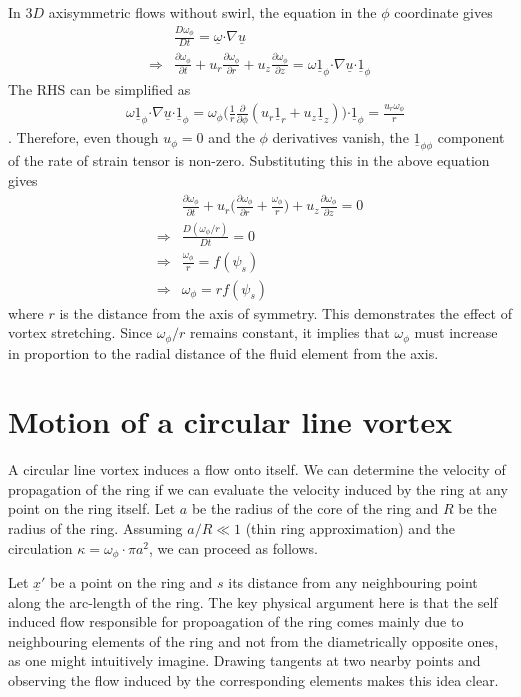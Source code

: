 \documentclass[11pt,a4paper]{article}
\newcommand{\pd}[2]{\frac{\partial #1}{\partial #2}}
\newcommand{\vect}[1]{\underline{#1}}
\newcommand{\1}{\vect{1}}
\newcommand{\grad}{\nabla}
\newcommand{\RA}{\Rightarrow}
\newcommand{\xp}{\vect x'}
\newcommand{\bcdot}{\boldsymbol{\cdot}}
\begin{document}
In $3D$ axisymmetric flows without swirl, the equation in the $\phi$ coordinate gives
\begin{align*}
&\frac{D\omega_\phi}{Dt} = \vect \omega \bcdot \grad \vect u\\
\RA&\pd{\omega_\phi}{t} + u_r\pd{\omega_\phi}{r} + u_z\pd{\omega_\phi}{z} = \omega \1_\phi \bcdot \grad \vect u \bcdot \1_\phi
\end{align*}
The RHS can be simplified as
\begin{align*}
&\omega \1_\phi \bcdot \grad \vect u \bcdot \1_\phi = \omega_\phi \bigg( \frac{1}{r} \frac{\partial}{\partial \phi}(u_r\1_r + u_z\1_z)\bigg) \bcdot \1_\phi = \frac{u_r\omega_\phi}{r}
\end{align*}.
Therefore, even though $u_\phi = 0$ and the $\phi$ derivatives vanish, the $\1_{\phi \phi}$ component of the rate of strain tensor is non-zero.
Substituting this in the above equation gives
\begin{align*}
&\pd{\omega_\phi}{t} + u_r\bigg(\pd{\omega_\phi}{r} + \frac{\omega_\phi}{r}\bigg)+ u_z\pd{\omega_\phi}{z} = 0\\
\RA&\frac{D(\omega_\phi/r)}{Dt} = 0\\
\RA&\frac{\omega_\phi}{r} = f(\psi_s)\\
\RA&\omega_\phi = r f(\psi_s)
\end{align*}
where $r$ is the distance from the axis of symmetry. This demonstrates the effect of vortex stretching. Since $\omega_\phi/r$ remains constant, it implies that $\omega_\phi$ must increase in proportion to the radial distance of the fluid element from the axis. 


\section{Motion of a circular line vortex}

A circular line vortex induces a flow onto itself. We can determine the velocity of propagation of the ring if we can evaluate the velocity induced by the ring at any point on the ring itself. Let $a$ be the radius of the core of the ring and $R$ be the radius of the ring. Assuming $a/R \ll 1$ (thin ring approximation) and the circulation $\kappa = \omega_\phi \cdot \pi a^2$, we can proceed as follows.

Let $\xp$ be a point on the ring and $s$ its distance from any neighbouring point along the arc-length of the ring. The key physical argument here is that the self induced flow responsible for propoagation of the ring comes mainly due to neighbouring elements of the ring and not from the diametrically opposite ones, as one might intuitively imagine. Drawing tangents at two nearby points and observing the flow induced by the corresponding elements makes this idea clear.
\end{document}
